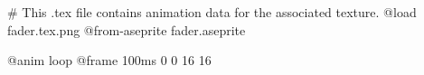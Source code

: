 # This .tex file contains animation data for the associated texture.
@load fader.tex.png
@from-aseprite fader.aseprite

@anim loop
	@frame 100ms 0 0 16 16
